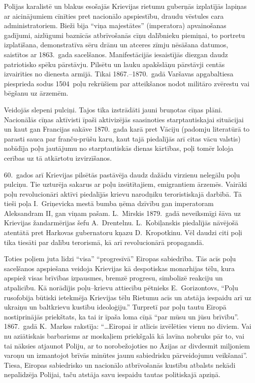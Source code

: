 \documentclass[twoside,a5paper,12pt,fleqn,openany]{extbook}
\begin{document}
Polijas karalistē un blakus esošajās Krievijas rietumu guberņās izplatījās lapiņas ar aicinājumiem cīnīties pret nacionālo apspiestību, draudu vēstules cara administratoriem. Bieži bija ``viņa majestātes'' (imperatora) apvainošanas gadījumi, aizlūgumi baznīcās atbrīvošanās cīņu dalībnieku piemiņai, to portretu izplatīšana, demonstratīva sēru drānu un atceres zīmju nēsāšana datumos, saistītos ar 1863.~gada sacelšanos. Manifestācijās iesaistījās diezgan daudz patriotisko spēku pārstāvju. Pilsētu un lauku apakšslāņu pārstāvji centās izvairīties no dienesta armijā. Tikai 1867.--1870.~gadā Varšavas apgabaltiesa piesprieda sodus 1504~poļu rekrūšiem par atteikšanos nodot militāro zvērestu vai bēgšanu uz ārzemēm.

Veidojās slepeni pulciņi. Tajos tika izstrādāti jauni bruņotas cīņas plāni. Nacionālās cīņas aktīvisti īpaši aktivizējās saasinoties starptautiskajai situācijai un kaut gan Francijas sakāve 1870.~gada karā pret Vāciju (padomju literatūrā to parasti sauca par franču-prūšu karu, kaut tajā piedalījās arī citas vācu valstis) nobīdīja poļu jautājumu no starptautiskās dienas kārtības, poļi tomēr loloja cerības uz tā atkārtotu izvirzīšanos.

60.~gados arī Krievijas pilsētās pastāvēja daudz dažādu virzienu nelegālu poļu pulciņu. Tie uzturēja sakarus ar poļu izsūtītajiem, emigrantiem ārzemēs. Vairāki poļu revolucionāri aktīvi piedalījās krievu narodņiku teroristiskajā darbībā. Tā tieši poļa I.~Griņevicka mestā bumba ņēma dzīvību gan imperatoram Aleksandram II, gan viņam pašam. L.~Mirskis 1879.~gadā neveiksmīgi šāva uz Krievijas žandarmērijas šefu A.~Drentelnu. L.~Kobiļanskis piedalījās nāvējošā atentātā pret Harkovas gubernatoru kņazu D.~Kropotkinu. Vēl daudzi citi poļi tika tiesāti par dalību terorismā, kā arī revolucionārā propagandā.

Toties poļiem juta līdzi ``visa'' ``progresīvā'' Eiropas sabiedrība. Tās acīs poļu sacelšanos apspiešana veidoja Krievijas kā despotiskas monarhijas tēlu, kura apspiež visas brīvības izpausmes, bremzē progresu, simbolizē reakciju un atpalicību. Kā norādījis poļu--krievu attiecību pētnieks E.~Gorizontovs, ``Poļu rusofobija būtiski ietekmēja Krievijas tēlu Rietumu acīs un atstāja iespaidu arī uz ukraiņu un baltkrievu kustību ideoloģiju.'' Turpretī par poļu tautu Eiropā nostiprinājās priekštats, ka tai ir īpaša loma cīņā ``par mūsu un jūsu brīvību''. 1867.~gadā K.~Markss rakstīja: ``\dots{}Eiropai ir atlicis izvēlēties vienu no diviem. Vai nu aziātiskais barbarisms ar moskaļiem priekšgalā kā lavīna nobruks pār to, vai tai nāksies atjaunot Poliju, ar to norobežojoties no Āzijas ar divdesmit miljoniem varoņu un izmantojot brīvās minūtes jaunu sabiedrisku pārveidojumu veikšanai''. Tiesa, Eiropas sabiedrisko un nacionālo atbrīvošanās kustību atbalsts nekādi nepalīdzēja Polijai, taču atstāja savu iespaidu tautas politiskajā apziņā.
\end{document}
